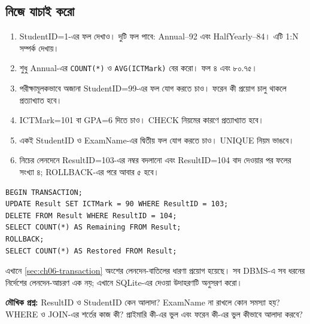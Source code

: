 \subsection{নিজে যাচাই করো}
\begin{enumerate}
\item StudentID=1-এর ফল দেখাও। দুটি ফল পাবে: Annual--92 এবং HalfYearly--84। এটি 1:N সম্পর্ক দেখায়।
\item শুধু Annual-এর \texttt{COUNT(*)} ও \texttt{AVG(ICTMark)} বের করো। ফল ৪ এবং ৮০.৭৫।
\item পরীক্ষামূলকভাবে অজানা StudentID=99-এর ফল যোগ করতে চাও। ফরেন কী প্রয়োগ চালু থাকলে প্রত্যাখ্যাত হবে।
\item ICTMark=101 বা GPA=6 দিতে চাও। CHECK নিয়মের কারণে প্রত্যাখ্যাত হবে।
\item একই StudentID ও ExamName-এর দ্বিতীয় ফল যোগ করতে চাও। UNIQUE নিয়ম ভাঙবে।
\item নিচের লেনদেনে ResultID=103-এর নম্বর বদলানো এবং ResultID=104 বাদ দেওয়ার পর ফলের সংখ্যা ৪; ROLLBACK-এর পরে আবার ৫ হবে।
\end{enumerate}
\begin{verbatim}
BEGIN TRANSACTION;
UPDATE Result SET ICTMark = 90 WHERE ResultID = 103;
DELETE FROM Result WHERE ResultID = 104;
SELECT COUNT(*) AS Remaining FROM Result;
ROLLBACK;
SELECT COUNT(*) AS Restored FROM Result;
\end{verbatim}
এখানে \ref{sec:ch06-transaction} অংশের লেনদেন-বাতিলের ধারণা প্রয়োগ হয়েছে। সব DBMS-এ সব ধরনের নির্দেশের লেনদেন-আচরণ এক নয়; এখানে SQLite-এর দেওয়া উদাহরণটি অনুসরণ করো।

\textbf{মৌখিক প্রশ্ন:} ResultID ও StudentID কেন আলাদা? ExamName না রাখলে কোন সমস্যা হয়? WHERE ও JOIN-এর শর্তের কাজ কী? প্রাইমারি কী-এর ভুল এবং ফরেন কী-এর ভুল কীভাবে আলাদা করবে?

